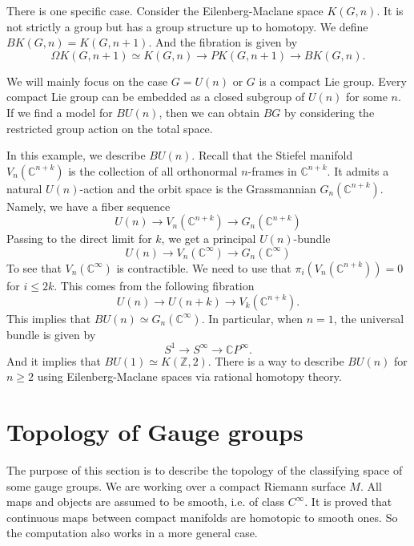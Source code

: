 \begin{example}
    There is one specific case. Consider the Eilenberg-Maclane space \(K(G,n)\). It is not strictly a group but has a group structure up to homotopy. We define \(BK(G,n)=K(G,n+1)\). And the fibration is given by 
    \[\Omega K(G,n+1)\simeq K(G,n)\rightarrow PK(G,n+1)\rightarrow BK(G,n).\]
\end{example}

We will mainly focus on the case \(G=U(n)\) or \(G\) is a compact Lie group. Every compact Lie group can be embedded as a closed subgroup of \(U(n)\) for some \(n\). If we find a model for \(BU(n)\), then we can obtain \(BG\) by considering the restricted group action on the total space. 

\begin{example}
    In this example, we describe \(BU(n)\). Recall that the Stiefel manifold \(V_n(\mathbb{C}^{n+k})\) is the collection of all orthonormal \(n\)-frames in \(\mathbb{C}^{n+k}\). It admits a natural \(U(n)\)-action and the orbit space is the Grassmannian \(G_n(\mathbb{C}^{n+k})\). Namely, we have a fiber sequence 
    \[U(n)\rightarrow V_n(\mathbb{C}^{n+k})\rightarrow G_n(\mathbb{C}^{n+k}) \]
    Passing to the direct limit for \(k\), we get a principal \(U(n)\)-bundle
    \[U(n)\rightarrow V_n(\mathbb{C}^\infty)\rightarrow G_n(\mathbb{C}^\infty)\]
    To see that \(V_n(\mathbb{C}^\infty)\) is contractible. We need to use that \(\pi_i(V_n(\mathbb{C}^{n+k}))=0\) for \(i\leq 2k\). This comes from the following fibration
    \[U(n)\rightarrow U(n+k)\rightarrow V_k(\mathbb{C}^{n+k}).\]
    This implies that \(BU(n)\simeq G_n(\mathbb{C}^\infty)\). In particular, when \(n=1\), the universal bundle is given by 
    \[S^1\rightarrow S^\infty\rightarrow \mathbb{C}P^\infty.\]
    And it implies that \(BU(1)\simeq K(\mathbb{Z},2)\). There is a way to describe \(BU(n)\) for \(n\geq 2\) using Eilenberg-Maclane spaces via rational homotopy theory.
\end{example}

\section{Topology of Gauge groups}

The purpose of this section is to describe the topology of the classifying space of some gauge groups. We are working over a compact Riemann surface \(M\). All maps and objects are assumed to be smooth, i.e. of class \(C^\infty\). It is proved that continuous maps between compact manifolds are homotopic to smooth ones. So the computation also works in a more general case. 


